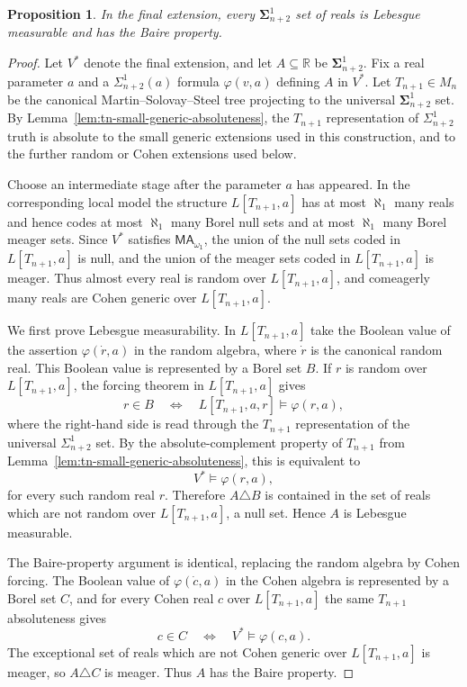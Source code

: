 \documentclass[10pt,a4paper]{amsart}
\newtheorem{proposition}{Proposition}
\newcommand{\MA}{\mathsf{MA_{\omega_1}}}
\begin{document}
\begin{proposition}\label{Mn-regularity}
In the final extension, every $\boldsymbol{\Sigma}^1_{n+2}$ set of reals is
Lebesgue measurable and has the Baire property.
\end{proposition}

\begin{proof}
Let $V^*$ denote the final extension, and let
$A\subseteq\mathbb R$ be $\boldsymbol{\Sigma}^1_{n+2}$.  Fix a real parameter
$a$ and a $\Sigma^1_{n+2}(a)$ formula $\varphi(v,a)$ defining $A$ in $V^*$.
Let $T_{n+1}\in M_n$ be the canonical Martin--Solovay--Steel tree projecting
to the universal $\boldsymbol{\Sigma}^1_{n+2}$ set.  By
Lemma~\ref{lem:tn-small-generic-absoluteness}, the $T_{n+1}$ representation
of $\Sigma^1_{n+2}$ truth is absolute to the small generic extensions used in
this construction, and to the further random or Cohen extensions used below.

Choose an intermediate stage after the parameter $a$ has appeared.  In the
corresponding local model the structure $L[T_{n+1},a]$ has at most
$\aleph_1$ many reals and hence codes at most $\aleph_1$ many Borel null sets
and at most $\aleph_1$ many Borel meager sets.  Since $V^*$ satisfies
$\MA$, the union of the null sets coded in $L[T_{n+1},a]$ is null, and the
union of the meager sets coded in $L[T_{n+1},a]$ is meager.  Thus almost every
real is random over $L[T_{n+1},a]$, and comeagerly many reals are Cohen
generic over $L[T_{n+1},a]$.

We first prove Lebesgue measurability.  In $L[T_{n+1},a]$ take the Boolean
value of the assertion $\varphi(\dot r,a)$ in the random algebra, where
$\dot r$ is the canonical random real.  This Boolean value is represented by a
Borel set $B$.  If $r$ is random over $L[T_{n+1},a]$, the forcing theorem in
$L[T_{n+1},a]$ gives
\[
   r\in B
   \quad\Longleftrightarrow\quad
   L[T_{n+1},a,r]\models \varphi(r,a),
\]
where the right-hand side is read through the $T_{n+1}$ representation of the
universal $\Sigma^1_{n+2}$ set.  By the absolute-complement property of
$T_{n+1}$ from Lemma~\ref{lem:tn-small-generic-absoluteness}, this is
equivalent to
\[
   V^*\models \varphi(r,a),
\]
for every such random real $r$.  Therefore $A\triangle B$ is contained in the
set of reals which are not random over $L[T_{n+1},a]$, a null set.  Hence
$A$ is Lebesgue measurable.

The Baire-property argument is identical, replacing the random algebra by
Cohen forcing.  The Boolean value of $\varphi(\dot c,a)$ in the Cohen algebra
is represented by a Borel set $C$, and for every Cohen real $c$ over
$L[T_{n+1},a]$ the same $T_{n+1}$ absoluteness gives
\[
   c\in C
   \quad\Longleftrightarrow\quad
   V^*\models \varphi(c,a).
\]
The exceptional set of reals which are not Cohen generic over
$L[T_{n+1},a]$ is meager, so $A\triangle C$ is meager.  Thus $A$ has the
Baire property.
\end{proof}
\end{document}
